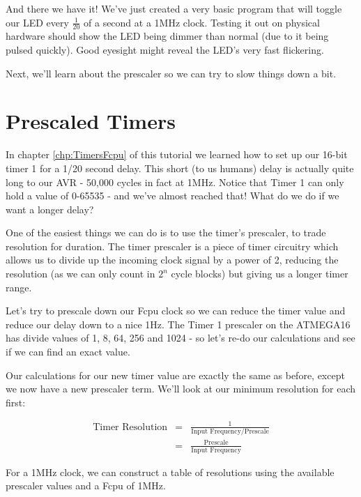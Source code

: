 \documentclass[a4paper,oneside,notitlepage]{book}
\begin{document}
And there we have it! We've just created a very basic program that will toggle our LED every \(\frac{1}{20}\) of a second at a 1MHz clock. Testing it out on physical hardware should show the LED being dimmer than normal (due to it being pulsed quickly). Good eyesight might reveal the LED's very fast flickering.

Next, we'll learn about the prescaler so we can try to slow things down a bit. 


\label{chp:PrescaledTimers}
\chapter{Prescaled Timers}

In chapter \ref{chp:TimersFcpu} of this tutorial we learned how to set up our 16-bit timer 1 for a 1/20 second delay. This short (to us humans) delay is actually quite long to our AVR - 50,000 cycles in fact at 1MHz. Notice that Timer 1 can only hold a value of 0-65535 - and we've almost reached that! What do we do if we want a longer delay?

One of the easiest things we can do is to use the timer's prescaler, to trade resolution for duration. The timer prescaler is a piece of timer circuitry which allows us to divide up the incoming clock signal by a power of 2, reducing the resolution (as we can only count in \(2^n\) cycle blocks) but giving us a longer timer range.

Let's try to prescale down our Fcpu clock so we can reduce the timer value and reduce our delay down to a nice 1Hz. The Timer 1 prescaler on the ATMEGA16 has divide values of 1, 8, 64, 256 and 1024 - so let's re-do our calculations and see if we can find an exact value.

Our calculations for our new timer value are exactly the same as before, except we now have a new prescaler term. We'll look at our minimum resolution for each first:

\begin{displaymath}
\begin{array}{rcl}
	\text{Timer Resolution} & = & \frac{1}{\text{Input Frequency} / \text{Prescale}} \\
	                        & = & \frac{\text{Prescale}}{\text{Input Frequency}}
\end{array}
\end{displaymath}

For a 1MHz clock, we can construct a table of resolutions using the available prescaler values and a Fcpu of 1MHz.
\end{document}
